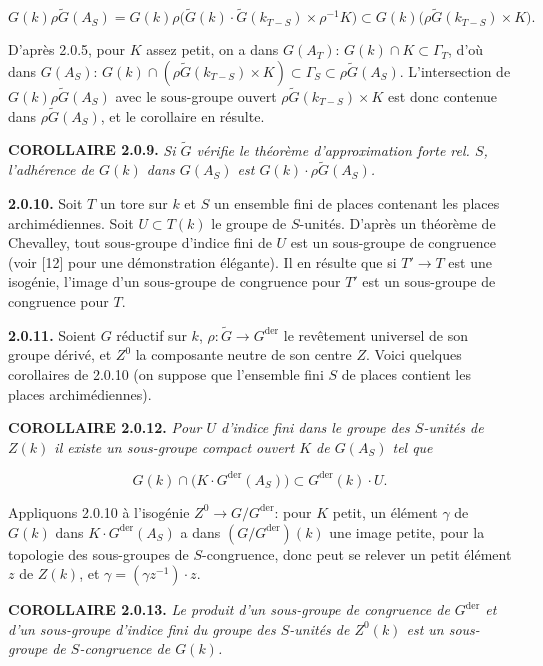 \documentclass[10pt,a4paper]{article}
\begin{document}
\[
G(k)\rho\widetilde G(A_S)
=G(k)\rho\bigl(\widetilde G(k)\cdot\widetilde G(k_{T-S})\times\rho^{-1}K\bigr)
\subset G(k)\bigl(\rho\widetilde G(k_{T-S})\times K\bigr).
\]

D'après 2.0.5, pour \(K\) assez petit, on a dans \(G(A_T)\): \(G(k)\cap K\subset\Gamma_T\), d'où dans \(G(A_S)\): \(G(k)\cap(\rho\widetilde G(k_{T-S})\times K)\subset\Gamma_S\subset\rho\widetilde G(A_S)\). L'intersection de \(G(k)\rho\widetilde G(A_S)\) avec le sous-groupe ouvert \(\rho\widetilde G(k_{T-S})\times K\) est donc contenue dans \(\rho\widetilde G(A_S)\), et le corollaire en résulte.

\textbf{COROLLAIRE 2.0.9.} \emph{Si \(\widetilde G\) vérifie le théorème d'approximation forte rel. \(S\), l'adhérence de \(G(k)\) dans \(G(A_S)\) est \(G(k)\cdot\rho\widetilde G(A_S)\).}

\textbf{2.0.10.} Soit \(T\) un tore sur \(k\) et \(S\) un ensemble fini de places contenant les places archimédiennes. Soit \(U\subset T(k)\) le groupe de \(S\)-unités. D'après un théorème de Chevalley, tout sous-groupe d'indice fini de \(U\) est un sous-groupe de congruence (voir {[}12{]} pour une démonstration élégante). Il en résulte que si \(T'\to T\) est une isogénie, l'image d'un sous-groupe de congruence pour \(T'\) est un sous-groupe de congruence pour \(T\).

\textbf{2.0.11.} Soient \(G\) réductif sur \(k\), \(\rho:\widetilde G\to G^{\mathrm{der}}\) le revêtement universel de son groupe dérivé, et \(Z^0\) la composante neutre de son centre \(Z\). Voici quelques corollaires de 2.0.10 (on suppose que l'ensemble fini \(S\) de places contient les places archimédiennes).

\textbf{COROLLAIRE 2.0.12.} \emph{Pour \(U\) d'indice fini dans le groupe des \(S\)-unités de \(Z(k)\) il existe un sous-groupe compact ouvert \(K\) de \(G(A_S)\) tel que}

\[
G(k)\cap\bigl(K\cdot G^{\mathrm{der}}(A_S)\bigr)\subset G^{\mathrm{der}}(k)\cdot U.
\]

Appliquons 2.0.10 à l'isogénie \(Z^0\to G/G^{\mathrm{der}}\): pour \(K\) petit, un élément \(\gamma\) de \(G(k)\) dans \(K\cdot G^{\mathrm{der}}(A_S)\) a dans \((G/G^{\mathrm{der}})(k)\) une image petite, pour la topologie des sous-groupes de \(S\)-congruence, donc peut se relever un petit élément \(z\) de \(Z(k)\), et \(\gamma=(\gamma z^{-1})\cdot z\).

\textbf{COROLLAIRE 2.0.13.} \emph{Le produit d'un sous-groupe de congruence de \(G^{\mathrm{der}}\) et d'un sous-groupe d'indice fini du groupe des \(S\)-unités de \(Z^0(k)\) est un sous-groupe de \(S\)-congruence de \(G(k)\).}
\end{document}
